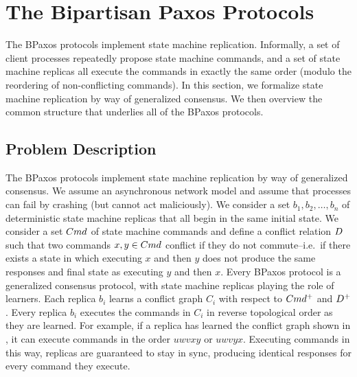 \section{The Bipartisan Paxos Protocols}
The BPaxos protocols implement state machine replication. Informally, a set of
client processes repeatedly propose state machine commands, and a set of state
machine replicas all execute the commands in exactly the same order (modulo the
reordering of non-conflicting commands). In this section, we formalize state
machine replication by way of generalized consensus. We then overview the
common structure that underlies all of the BPaxos protocols.

\subsection{Problem Description}
The BPaxos protocols implement state machine replication by way of generalized
consensus. We assume an asynchronous network model and assume that processes
can fail by crashing (but cannot act maliciously). We consider a set $b_1, b_2,
\ldots, b_n$ of deterministic state machine replicas that all begin in the same
initial state. We consider a set $Cmd$ of state machine commands and define a
conflict relation $D$ such that two commands $x, y \in Cmd$ conflict
if they do not commute--i.e.\ if there exists a state in which executing $x$
and then $y$ does not produce the same responses and final state as executing
$y$ and then $x$.
%
Every BPaxos protocol is a generalized consensus protocol, with state machine
replicas playing the role of learners. Each replica $b_i$ learns a conflict
graph $C_i$ with respect to $Cmd^+$ and $D^+$. Every replica $b_i$
executes the commands in $C_i$ in reverse topological order as they are
learned. For example, if a replica has learned the conflict graph shown in
, it can execute commands in the order $uwvxy$ or $uwvyx$.
Executing commands in this way, replicas are guaranteed to stay in sync,
producing identical responses for every command they execute.

